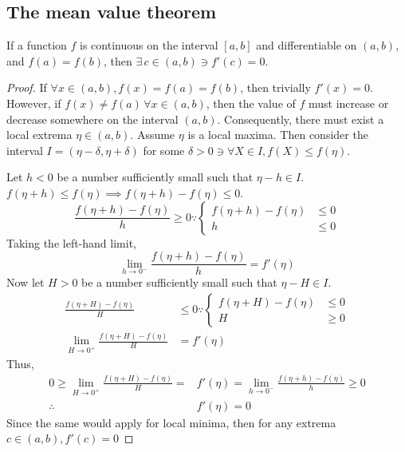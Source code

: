 \subsection{The mean value theorem}
\begin{lemma}\label{lemma:ROLLES}
	If a function $f$ is continuous on the interval $[a,b]$ and differentiable on $(a,b)$, and $f(a)=f(b)$, then $\exists\,c\in(a,b)\ni f'(c)=0$.
	\begin{proof}
		If $\forall x\in(a,b), f(x)=f(a)=f(b)$, then trivially $f'(x)=0$. However, if 
		$f(x)\neq f(a)\,\forall x\in(a,b)$, then the value of $f$ must increase or decrease somewhere
		on the interval $(a,b)$. Consequently, there must exist a local extrema $\eta\in(a,b)$. Assume $\eta$ is a
		local maxima. Then consider the interval $I=(\eta-\delta,\eta+\delta)$ for some $\delta>0\ni\forall X\in I,f(X)\leq f(\eta)$.

		Let $h<0$ be a number sufficiently small such that $\eta-h\in I$. $f(\eta+h)\leq f(\eta)\implies f(\eta+h)-f(\eta)\leq0$.
		$$
			\frac{f(\eta+h)-f(\eta)}{h}\geq0\because\left\{\begin{matrix}
				f(\eta+h)-f(\eta)&\leq0\\
				h&\leq0
			\end{matrix}\right.
		$$
		Taking the left-hand limit,
		$$
			\lim_{h\rightarrow0^-}\frac{f(\eta+h)-f(\eta)}{h}=f'(\eta)
		$$
		Now let $H>0$ be a number sufficiently small such that $\eta-H\in I$.
		\begin{align*}
			\frac{f(\eta+H)-f(\eta)}{H}&\leq0\because\left\{\begin{matrix}
				f(\eta+H)-f(\eta)&\leq0\\
				H&\geq0
			\end{matrix}\right.\\
			\lim_{H\rightarrow0^+}\frac{f(\eta+H)-f(\eta)}{H}&=f'(\eta)
		\end{align*}
		Thus,
		\begin{align*}
			0\geq\lim_{H\rightarrow0^+}\frac{f(\eta+H)-f(\eta)}{H}=&f'(\eta)=\lim_{h\rightarrow0^-}\frac{f(\eta+h)-f(\eta)}{h}\geq0\\
			\therefore\,&f'(\eta)=0
		\end{align*}
		Since the same would apply for local minima, then for any extrema $c\in(a,b),f'(c)=0$
	\end{proof}
\end{lemma}
